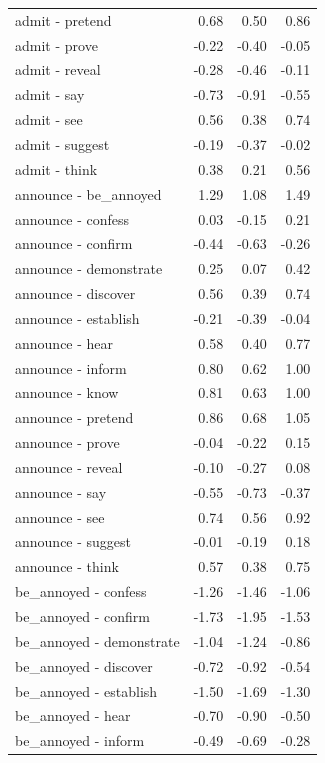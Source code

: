 \begin{longtable}{lrrr}
  admit - pretend & 0.68 & 0.50 & 0.86 \\ 
  admit - prove & -0.22 & -0.40 & -0.05 \\ 
  admit - reveal & -0.28 & -0.46 & -0.11 \\ 
  admit - say & -0.73 & -0.91 & -0.55 \\ 
  admit - see & 0.56 & 0.38 & 0.74 \\ 
  admit - suggest & -0.19 & -0.37 & -0.02 \\ 
  admit - think & 0.38 & 0.21 & 0.56 \\ 
  announce - be_annoyed & 1.29 & 1.08 & 1.49 \\ 
  announce - confess & 0.03 & -0.15 & 0.21 \\ 
  announce - confirm & -0.44 & -0.63 & -0.26 \\ 
  announce - demonstrate & 0.25 & 0.07 & 0.42 \\ 
  announce - discover & 0.56 & 0.39 & 0.74 \\ 
  announce - establish & -0.21 & -0.39 & -0.04 \\ 
  announce - hear & 0.58 & 0.40 & 0.77 \\ 
  announce - inform & 0.80 & 0.62 & 1.00 \\ 
  announce - know & 0.81 & 0.63 & 1.00 \\ 
  announce - pretend & 0.86 & 0.68 & 1.05 \\ 
  announce - prove & -0.04 & -0.22 & 0.15 \\ 
  announce - reveal & -0.10 & -0.27 & 0.08 \\ 
  announce - say & -0.55 & -0.73 & -0.37 \\ 
  announce - see & 0.74 & 0.56 & 0.92 \\ 
  announce - suggest & -0.01 & -0.19 & 0.18 \\ 
  announce - think & 0.57 & 0.38 & 0.75 \\ 
  be_annoyed - confess & -1.26 & -1.46 & -1.06 \\ 
  be_annoyed - confirm & -1.73 & -1.95 & -1.53 \\ 
  be_annoyed - demonstrate & -1.04 & -1.24 & -0.86 \\ 
  be_annoyed - discover & -0.72 & -0.92 & -0.54 \\ 
  be_annoyed - establish & -1.50 & -1.69 & -1.30 \\ 
  be_annoyed - hear & -0.70 & -0.90 & -0.50 \\ 
  be_annoyed - inform & -0.49 & -0.69 & -0.28 \\ 

\end{longtable}
